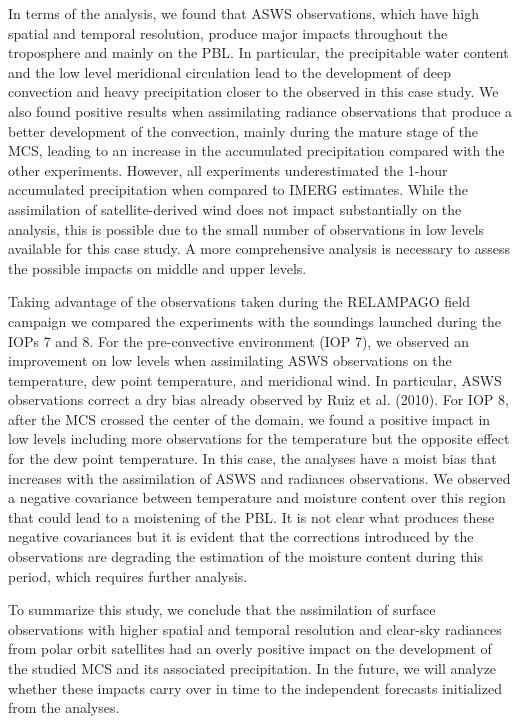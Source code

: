 \documentclass[final,5p,times,twocolumn,authoryear]{elsarticle} %
\begin{document}
In terms of the analysis, we found that ASWS observations, which have high spatial and temporal resolution, produce major impacts throughout the troposphere and mainly on the PBL. In particular, the precipitable water content and the low level meridional circulation lead to the development of deep convection and heavy precipitation closer to the observed in this case study. We also found positive results when assimilating radiance observations that produce a better development of the convection, mainly during the mature stage of the MCS, leading to an increase in the accumulated precipitation compared with the other experiments. However, all experiments underestimated the 1-hour accumulated precipitation when compared to IMERG estimates. While the assimilation of satellite-derived wind does not impact substantially on the analysis, this is possible due to the small number of observations in low levels available for this case study. A more comprehensive analysis is necessary to assess the possible impacts on middle and upper levels.

Taking advantage of the observations taken during the RELAMPAGO field campaign we compared the experiments with the soundings launched during the IOPs 7 and 8. For the pre-convective environment (IOP 7), we observed an improvement on low levels when assimilating ASWS observations on the temperature, dew point temperature, and meridional wind. In particular, ASWS observations correct a dry bias already observed by Ruiz et al. (2010). For IOP 8, after the MCS crossed the center of the domain, we found a positive impact in low levels including more observations for the temperature but the opposite effect for the dew point temperature. In this case, the analyses have a moist bias that increases with the assimilation of ASWS and radiances observations. We observed a negative covariance between temperature and moisture content over this region that could lead to a moistening of the PBL. It is not clear what produces these negative covariances but it is evident that the corrections introduced by the observations are degrading the estimation of the moisture content during this period, which requires further analysis.

To summarize this study, we conclude that the assimilation of surface observations with higher spatial and temporal resolution and clear-sky radiances from polar orbit satellites had an overly positive impact on the development of the studied MCS and its associated precipitation. In the future, we will analyze whether these impacts carry over in time to the independent forecasts initialized from the analyses.
\end{document}

